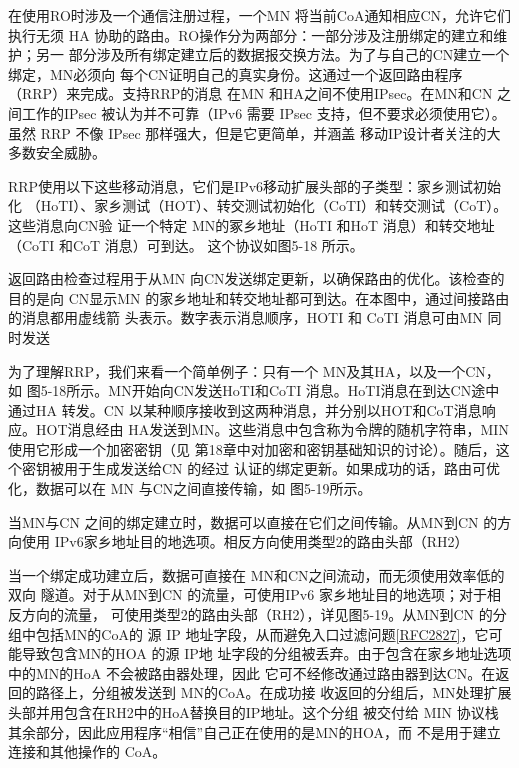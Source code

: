 在使用RO时涉及一个通信注册过程，一个MN 将当前CoA通知相应CN，允许它们
执行无须 HA 协助的路由。RO操作分为两部分：一部分涉及注册绑定的建立和维护；另一
部分涉及所有绑定建立后的数据报交换方法。为了与自己的CN建立一个绑定，MN必须向
每个CN证明自己的真实身份。这通过一个返回路由程序（RRP）来完成。支持RRP的消息
在MN 和HA之间不使用IPsec。在MN和CN 之间工作的IPsec 被认为并不可靠（IPv6 需要
IPsec 支持，但不要求必须使用它）。虽然 RRP 不像 IPsec 那样强大，但是它更简单，并涵盖
移动IP设计者关注的大多数安全威胁。

RRP使用以下这些移动消息，它们是IPv6移动扩展头部的子类型：家乡测试初始化
（HoTI）、家乡测试（HOT）、转交测试初始化（CoTI）和转交测试（CoT）。这些消息向CN验
证一个特定 MN的冢乡地址（HoTI 和HoT 消息）和转交地址（CoTI 和CoT 消息）可到达。
这个协议如图5-18 所示。

返回路由检查过程用于从MN 向CN发送绑定更新，以确保路由的优化。该检查的目的是向
CN显示MN 的家乡地址和转交地址都可到达。在本图中，通过间接路由的消息都用虚线箭
头表示。数字表示消息顺序，HOTI 和 CoTI 消息可由MN 同时发送

为了理解RRP，我们来看一个简单例子：只有一个 MN及其HA，以及一个CN，如
图5-18所示。MN开始向CN发送HoTI和CoTI 消息。HoTI消息在到达CN途中通过HA
转发。CN 以某种顺序接收到这两种消息，并分别以HOT和CoT消息响应。HOT消息经由
HA发送到MN。这些消息中包含称为令牌的随机字符串，MIN使用它形成一个加密密钥（见
第18章中对加密和密钥基础知识的讨论）。随后，这个密钥被用于生成发送给CN 的经过
认证的绑定更新。如果成功的话，路由可优化，数据可以在 MN 与CN之间直接传输，如
图5-19所示。

当MN与CN 之间的绑定建立时，数据可以直接在它们之间传输。从MN到CN 的方向使用
IPv6家乡地址目的地选项。相反方向使用类型2的路由头部（RH2）

当一个绑定成功建立后，数据可直接在 MN和CN之间流动，而无须使用效率低的双向
隧道。对于从MN到CN 的流量，可使用IPv6 家乡地址目的地选项；对于相反方向的流量，
可使用类型2的路由头部（RH2），详见图5-19。从MN到CN 的分组中包括MN的CoA的
源 IP
地址字段，从而避免入口过滤问题\href{https://www.rfc-editor.org/rfc/rfc2827}{[RFC2827]}，它可能导致包含MN的HOA
的源 IP地
址字段的分组被丢弃。由于包含在家乡地址选项中的MN的HoA 不会被路由器处理，因此
它可不经修改通过路由器到达CN。在返回的路径上，分组被发送到 MN的CoA。在成功接
收返回的分组后，MN处理扩展头部并用包含在RH2中的HoA替换目的IP地址。这个分组
被交付给 MIN 协议栈其余部分，因此应用程序“相信”自己正在使用的是MN的HOA，而
不是用于建立连接和其他操作的 CoA。

